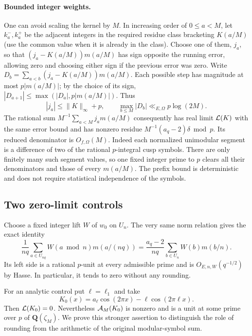 \documentclass[11pt]{article}
\newcommand{\Q}{\mathbf Q}\newcommand{\R}{\mathbf R}\newcommand{\Z}{\mathbf Z}
\begin{document}
\paragraph{Bounded integer weights.}
One can avoid scaling the kernel by $M$. In increasing order of $0\le a<M$, let $k^-_a,k^+_a$ be the adjacent integers in the required residue class bracketing $K(a/M)$ (use the common value when it is already in the class). Choose one of them, $j_a$, so that $(j_a-K(a/M))m(a/M)$ has sign opposite the running error, allowing zero and choosing either sign if the previous error was zero. Write $D_b=\sum_{a<b}(j_a-K(a/M))m(a/M)$. Each possible step has magnitude at most $p|m(a/M)|$; by the choice of its sign, $|D_{a+1}|\le\max(|D_a|,p|m(a/M)|)$. Thus
\[
 |j_a|\le\|K\|_\infty+p,\qquad
 \max_{b\le M}|D_b|\ll_{E,\Omega}p\log(2M).
\]
The rational sum $M^{-1}\sum_{a<M}j_a m(a/M)$ consequently has real limit $\mathcal L(K)$ with the same error bound and has nonzero residue $M^{-1}(a_q-2)\delta\bmod p$. Its reduced denominator is $O_{f,\Omega}(M)$. Indeed each normalized unimodular segment is a difference of two of the rational $p$-integral cusp symbols. There are only finitely many such segment values, so one fixed integer prime to $p$ clears all their denominators and those of every $m(a/M)$. The prefix bound is deterministic and does not require statistical independence of the symbols.

\subsection{Two zero-limit controls}
Choose a fixed integer lift $W$ of $w_0$ on $U_n$. The very same norm relation gives the exact identity
\[
 \frac1{nq}\sum_{a\in U_{nq}}W(a\bmod n)m(a/(nq))
       =\frac{a_q-2}{nq}\sum_{b\in U_n}W(b)m(b/n).
\]
Its left side is a rational $p$-unit at every admissible prime and is $O_{E,n,W}(q^{-1/2})$ by Hasse. In particular, it tends to zero without any rounding.

For an analytic control put $\ell=\ell_1$ and take
\[
 K_0(x)=a_\ell\cos(2\pi x)-\ell\cos(2\pi\ell x).
\]
Then $\mathcal L(K_0)=0$. Nevertheless $\mathcal A_M(K_0)$ is nonzero and is a unit at some prime over $p$ of $\Q(\zeta_M)$. We prove this stronger assertion to distinguish the role of rounding from the arithmetic of the original modular-symbol sum.
\end{document}

